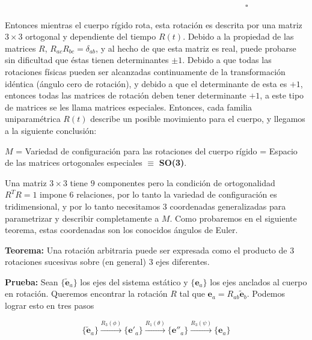 \documentclass[a4paper,10pt]{article}
\numberwithin{equation}{section}
\newcommand{\teorema}{\textbf{Teorema: }}
\newcommand{\prueba}{\textbf{Prueba: }}
\begin{document}
$\hspace{12cm} \square$

\vspace{.3cm}

Entonces mientras el cuerpo rígido rota, esta rotación es descrita por una matriz 
$3\times 3$ ortogonal y dependiente del tiempo $R(t)$. Debido a la propiedad de 
las matrices $R$, $R_{ac}R_{bc} = \delta_{ab}$, y al hecho de que esta matriz es 
real, puede probarse sin dificultad que éstas tienen determinantes $\pm 1$. Debido 
a que todas las rotaciones físicas pueden ser alcanzadas continuamente de la 
transformación idéntica (ángulo cero de rotación), y debido a que el determinante 
de esta es $+1$, entonces todas las matrices de rotación deben tener determinante $+1$, 
a este tipo de matrices se les llama matrices especiales. Entonces, cada familia uniparamétrica $R(t)$ describe un posible movimiento para 
el cuerpo, y llegamos a la siguiente conclusión:

\begin{center}
 $M$ = Variedad de configuración para  las rotaciones del cuerpo rígido = Espacio de las matrices 
 ortogonales especiales $\equiv$ \textbf{SO(3)}.
\end{center}

\vspace{.3cm}

Una matriz $3\times 3$ tiene $9$ componentes pero la condición de ortogonalidad $R^TR=1$
impone $6$ relaciones, por lo tanto la variedad de configuración es tridimensional, y 
por lo tanto necesitamos $3$ coordenadas generalizadas para parametrizar y describir 
completamente a $M$. Como probaremos en el siguiente teorema, estas coordenadas son 
los conocidos ángulos de Euler.

\vspace{.3cm}

\teorema Una rotación arbitraria puede ser expresada como el producto de $3$ rotaciones 
sucesivas sobre (en general) $3$ ejes diferentes.

\vspace{.3cm}

\prueba Sean $\{{\tilde{\mathbf{e}}_a\}}$ los ejes del sistema estático y 
$\{{\mathbf{e}_a\}}$ los ejes anclados al cuerpo en rotación. Queremos encontrar 
la rotación $R$ tal que $\mathbf{e}_a = R_{ab}{\tilde{\mathbf{e}}_b}$. Podemos 
lograr esto en tres pasos

\begin{equation}
 \{{\tilde{\mathbf{e}}_a\}} \xrightarrow{R_3(\phi)} 
 \{{\mathbf{e}'_a\}} \xrightarrow{R_1(\theta)} 
 \{{\mathbf{e}''_a\}} \xrightarrow{R_3(\psi)} \{{\mathbf{e}_a\}}
\end{equation}
\end{document}
